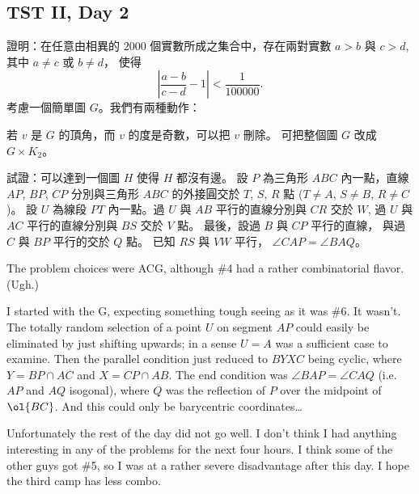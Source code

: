 \documentclass[11pt]{scrreprt}
\begin{document}
\subsection{TST II, Day 2}
\begin{enumerate}
  \setcounter{enumi}{3}
  \ii 證明：在任意由相異的 $2000$ 個實數所成之集合中，存在兩對實數 $a > b$ 與 $c > d$, 其中 $a \neq c$ 或 $b \neq d$， 使得
  \[ \left\lvert \frac{a-b}{c-d} - 1  \right\rvert < \frac{1}{100000}. \] %
  \ii 考慮一個簡單圖 $G$。我們有兩種動作：
  \begin{enumerate}[(1)]
    \ii 若 $v$ 是 $G$ 的頂角，而 $v$ 的度是奇數，可以把 $v$ 刪除。
    \ii 可把整個圖 $G$ 改成 $G \times K_2$。
  \end{enumerate}
  試證：可以達到一個圖 $H$ 使得 $H$ 都沒有邊。 %
  \ii 設 $P$ 為三角形 $ABC$ 內一點，直線 $AP$, $BP$, $CP$ 分別與三角形 $ABC$ 的外接圓交於 $T$, $S$, $R$ 點 ($T \neq A$, $S \neq B$, $R \neq C$)。
  設 $U$ 為線段 $PT$ 內一點。過 $U$ 與 $AB$ 平行的直線分別與 $CR$ 交於 $W$, 過 $U$ 與 $AC$ 平行的直線分別與 $BS$ 交於 $V$ 點。
  最後，設過 $B$ 與 $CP$ 平行的直線， 與過 $C$ 與 $BP$ 平行的交於 $Q$ 點。 已知 $RS$ 與 $VW$ 平行， $\angle CAP = \angle BAQ$。
\end{enumerate}
The problem choices were ACG, although \#4 had a rather combinatorial flavor. (Ugh.)

I started with the G, expecting something tough seeing as it was \#6. It wasn't. The totally random selection of a point $U$ on segment $AP$ could easily be eliminated by just shifting upwards; in a sense $U = A$ was a sufficient case to examine. Then the parallel condition just reduced to $BYXC$ being cyclic, where $Y = BP \cap AC$ and $X = CP \cap AB$. The end condition was $\angle BAP = \angle CAQ$ (i.e.\ $AP$ and $AQ$ isogonal), where $Q$ was the reflection of $P$ over the midpoint of $\ol{BC}$. And this could only be barycentric coordinates\dots

Unfortunately the rest of the day did not go well. I don't think I had anything interesting in any of the problems for the next four hours. I think some of the other guys got \#5, so I was at a rather severe disadvantage after this day. I hope the third camp has less combo.
\end{document}
